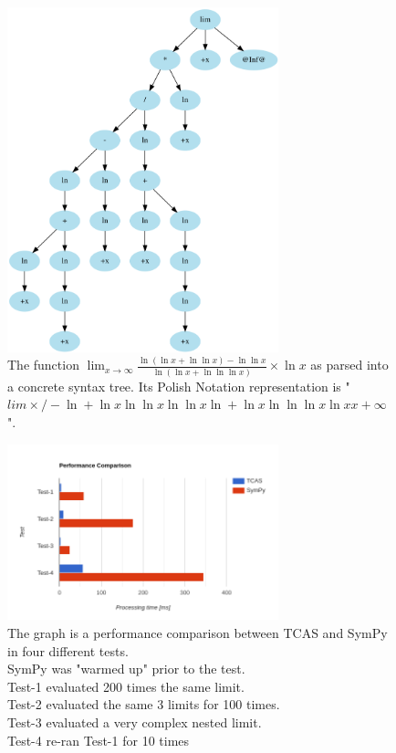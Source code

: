 \documentclass{article}
\theoremstyle{plain}
\theoremstyle{definition}
\theoremstyle{algorithm}
\begin{document}
	\begin{figure}
		\centering
		\includegraphics[width=0.7\textwidth]{img/parsed.PNG}
		\caption{The function \(\lim_{x \to \infty}{\frac{\ln{(\ln{x} + \ln{\ln{x}}) - \ln{\ln{x}}}}{\ln{(\ln{x} + \ln{\ln{\ln{x}}})}}\times \ln{x}}\) as parsed into a concrete syntax tree. Its Polish Notation representation is "\(lim \times / - \ln + \ln x \ln \ln x \ln \ln x \ln + \ln x \ln \ln \ln x \ln x x +\infty\)".} \label{fig:parsed}
	\end{figure}

    \begin{figure}
		\centering
		\includegraphics[width=0.7\textwidth]{img/performance_graph.PNG}
		\caption{The graph is a performance comparison between TCAS and SymPy in four different tests.\\SymPy was "warmed up" prior to the test.\\Test-1 evaluated 200 times the same limit.\\Test-2 evaluated the same 3 limits for 100 times.\\Test-3 evaluated a very complex nested limit.\\Test-4 re-ran Test-1 for 10 times} \label{fig:performance_graph}  
	\end{figure}

	
	
\end{document}

